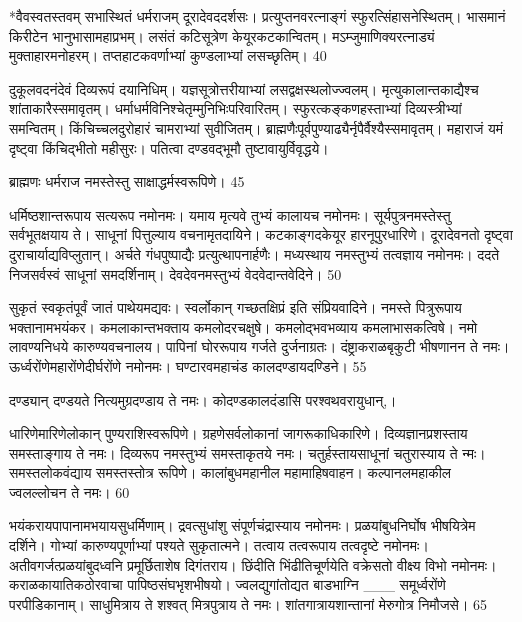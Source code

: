 *वैवस्वतस्तवम् सभास्थितं धर्मराजम् दूरादेवददर्शसः।
प्रत्युप्तनवरत्नाङ्गं स्फुरत्सिंहासनेस्थितम्।
भासमानं किरीटेन भानुभासामहाप्रभम्।
लसंतं कटिसूत्रेण केयूरकटकान्वितम्।
मऽम्जुमाणिक्यरत्नाड्यं मुक्ताहारमनोहरम्।
तप्तहाटकवर्णाभ्यां कुण्डलाभ्यां लसच्छृतिम्।
40

दुकूलवदनंदेवं दिव्यरूपं दयानिधिम्।
यज्ञसूत्रोत्तरीयाभ्यां लसद्वक्षस्थलोज्ज्वलम्।
मृत्युकालान्तकाद्यैश्च शांताकारैस्समावृतम्।
धर्माधर्मविनिश्चेतृम्मुनिभिःपरिवारितम्।
स्फुरत्कङ्कणहस्ताभ्यां दिव्यस्त्रीभ्यां समन्वितम्।
किंचिच्चलदुरोहारं चामराभ्यां सुवीजितम्।
ब्राह्मणैःपूर्वपुण्याढ्यैर्नृपैर्वैश्यैस्समावृतम्।
महाराजं यमं दृष्ट्वा किंचिद्भीतो महीसुरः।
पतित्वा दण्डवद्भूमौ तुष्टावायुर्विवृद्धये।

ब्राह्मणः
धर्मराज नमस्तेस्तु साक्षाद्धर्मस्वरूपिणे।
45


धर्मिष्ठशान्तरूपाय सत्यरूप नमोनमः।
यमाय मृत्यवे तुभ्यं कालायच नमोनमः।
सूर्यपुत्रनमस्तेस्तु सर्वभूतक्षयाय ते।
साधूनां पित्तुल्याय वचनामृतदायिने।
कटकाङ्गदकेयूर हारनूपुरधारिणे।
दूरादेवनतो दृष्ट्वा दुराचार्याद्यविप्लुतान्।
अर्चते गंधपुष्पाद्यैः प्रत्युत्थापनार्हणैः।
मध्यस्थाय नमस्तुभ्यं तत्वज्ञाय नमोनमः।
ददते निजसर्वस्वं साधूनां समदर्शिनाम्।
देवदेवनमस्तुभ्यं वेदवेदान्तवेदिने।
50

सुकृतं स्वकृतंपूर्वं जातं पाथेयमद्यवः।
स्वर्लोकान् गच्छतक्षिप्रं इति संप्रियवादिने।
नमस्ते पित्रुरूपाय भक्तानामभयंकर।
कमलाकान्तभक्ताय कमलोदरचक्षुषे।
कमलोद्भवभव्याय कमलाभासकत्विषे।
नमो लावण्यनिधये कारुण्यवचनालय।
पापिनां घोररूपाय गर्जते दुर्जनाग्रतः।
दंष्ट्राकराळबृकुटी भीषणानन ते नमः।
ऊर्ध्वरोंणेमहारोंणेदीर्घरोंणे नमोनमः।
घण्टारवमहाचंड कालदण्डायदण्डिने।
55

दण्ड्यान् दण्डयते नित्यमुग्रदण्डाय ते नमः।
कोदण्डकालदंडासि परश्वथवरायुधान्,।

धारिणेमारिणेलोकान् पुण्यराशिस्वरूपिणे।
ग्रहणेसर्वलोकानां जागरूकाधिकारिणे।
दिव्यज्ञानप्रशस्ताय समस्ताङ्गाय ते नमः।
दिव्यरूप नमस्तुभ्यं समस्ताकृतये नमः।
चतुर्हस्तायसाधूनां चतुरास्याय ते न्मः।
समस्तलोकवंद्याय समस्तस्तोत्र रूपिणे।
कालांबुधमहानील महामाहिषवाहन।
कल्पानलमहाकील ज्वलल्लोचन ते नमः।
60

भयंकरायपापानामभयायसुधर्मिणाम्।
द्रवत्सुधांशु संपूर्णचंद्रास्याय नमोनमः।
प्रळयांबुधनिर्घोष भीषयित्रेम दर्शिने।
गोभ्यां कारुण्यपूर्णाभ्यां पश्यते सुकृतात्मने।
तत्वाय तत्वरूपाय तत्वदृष्टे नमोनमः।
अतीवगर्जत्प्रळयांबुदध्वनि
प्रमूर्छिताशेष दिगंतराय।
छिंदीति भिंढीतिचूर्णयेति वक्रेसतो
वीक्ष्य विभो नमोनमः।
कराळकायातिकठोरवाचा पापिष्ठसंघभृशभीषयो।
ज्वलद्युगांतोद्यत बाडभाग्नि
___ समूर्ध्वरोंणे परपीडिकानाम्।
साधुमित्राय ते शश्वत् मित्रपुत्राय ते नमः।
शांतगात्रायशान्तानां मेरुगोत्र निमौजसे।
65


